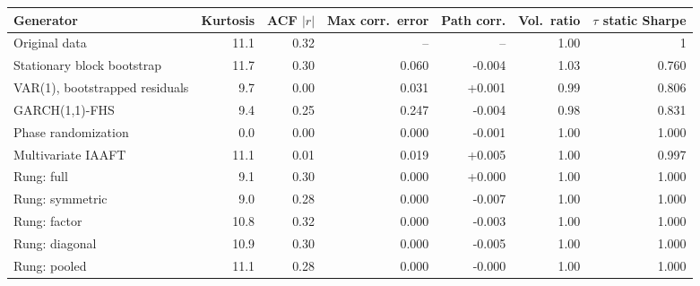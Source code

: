 \begin{tabular}{lrrrrrr}
\toprule
Generator & Kurtosis & ACF $|r|$ & Max corr.\ error & Path corr. & Vol.\ ratio & $\tau$ static Sharpe \\
\midrule
Original data & 11.1 & 0.32 & -- & -- & 1.00 & 1 \\
\midrule
Stationary block bootstrap & 11.7 & 0.30 & 0.060 & -0.004 & 1.03 & 0.760 \\
VAR(1), bootstrapped residuals & 9.7 & 0.00 & 0.031 & +0.001 & 0.99 & 0.806 \\
GARCH(1,1)-FHS & 9.4 & 0.25 & 0.247 & -0.004 & 0.98 & 0.831 \\
Phase randomization & 0.0 & 0.00 & 0.000 & -0.001 & 1.00 & 1.000 \\
Multivariate IAAFT & 11.1 & 0.01 & 0.019 & +0.005 & 1.00 & 0.997 \\
\midrule
Rung: full & 9.1 & 0.30 & 0.000 & +0.000 & 1.00 & 1.000 \\
Rung: symmetric & 9.0 & 0.28 & 0.000 & -0.007 & 1.00 & 1.000 \\
Rung: factor & 10.8 & 0.32 & 0.000 & -0.003 & 1.00 & 1.000 \\
Rung: diagonal & 10.9 & 0.30 & 0.000 & -0.005 & 1.00 & 1.000 \\
Rung: pooled & 11.1 & 0.28 & 0.000 & -0.000 & 1.00 & 1.000 \\
\bottomrule
\end{tabular}